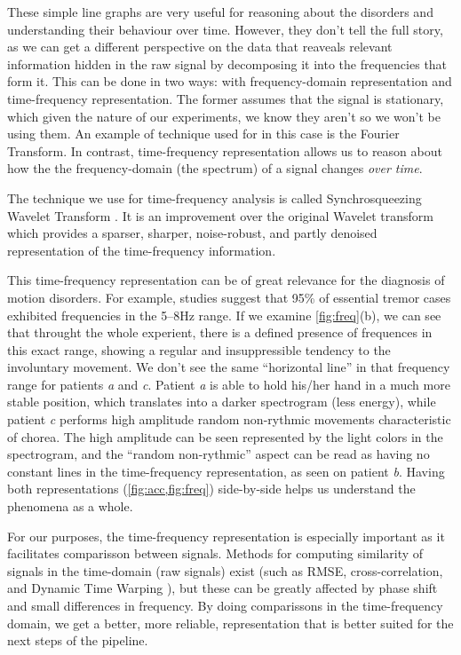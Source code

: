 These simple line graphs are very useful for reasoning about the disorders and understanding their behaviour over time. However, they don't tell the full story, as we can get a different perspective on the data that reaveals relevant information hidden in the raw signal by decomposing it into the frequencies that form it. This can be done in two ways: with frequency-domain representation and time-frequency representation. The former assumes that the signal is stationary, which given the nature of our experiments, we know they aren't so we won't be using them. An example of technique used for in this case is the Fourier Transform. In contrast, time-frequency representation allows us to reason about how the the frequency-domain (the spectrum) of a signal changes \textit{over time}.

The technique we use for time-frequency analysis is called Synchrosqueezing Wavelet Transform . It is an improvement over the original Wavelet transform  which provides a sparser, sharper, noise-robust, and partly denoised representation of the time-frequency information. 

This time-frequency representation can be of great relevance for the diagnosis of motion disorders. For example, studies suggest that 95\% of essential tremor cases exhibited frequencies in the 5--8Hz range. If we examine \cref{fig:freq}(b), we can see that throught the whole experient, there is a defined presence of frequences in this exact range, showing a regular and insuppressible tendency to the involuntary movement. We don't see the same ``horizontal line'' in that frequency range for patients \textit{a} and \textit{c}. Patient \textit{a} is able to hold his/her hand in a much more stable position, which translates into a darker spectrogram (less energy), while patient \textit{c} performs high amplitude random non-rythmic movements characteristic of chorea. The high amplitude can be seen represented by the light colors in the spectrogram, and the ``random non-rythmic'' aspect can be read as having no constant lines in the time-frequency representation, as seen on patient \textit{b}. Having both representations (\cref{fig:acc,fig:freq}) side-by-side helps us understand the phenomena as a whole. 

For our purposes, the time-frequency representation is especially important as it facilitates comparisson between signals. Methods for computing similarity of signals in the time-domain (raw signals) exist (such as RMSE, cross-correlation, and Dynamic Time Warping ), but these can be greatly affected by phase shift and small differences in frequency. By doing comparissons in the time-frequency domain, we get a better, more reliable, representation that is better suited for the next steps of the pipeline.

